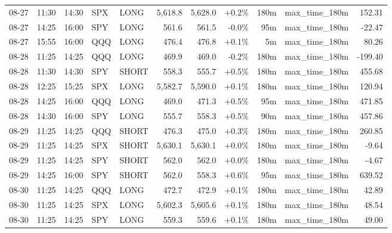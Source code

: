 \documentclass[11pt,a4paper,twoside]{article}
\begin{document}
\begin{center}
\begin{longtable}{>{\color{txtmain}}l l l l l r r r r >{\color{txtmain}}l r}
08-27 & 11:30 & 14:30 & SPX & LONG & 5,618.8 & 5,628.0 & \textcolor{wingreen}{+0.2\%} & 180m & max\_time\_180m & \textcolor{wingreen}{152.31} \\
08-27 & 14:25 & 16:00 & SPY & LONG & 561.6 & 561.5 & \textcolor{lossred}{-0.0\%} & 95m & max\_time\_180m & \textcolor{lossred}{-22.47} \\
08-27 & 15:55 & 16:00 & QQQ & LONG & 476.4 & 476.8 & \textcolor{wingreen}{+0.1\%} & 5m & max\_time\_180m & \textcolor{wingreen}{80.26} \\
08-28 & 11:25 & 14:25 & QQQ & LONG & 469.9 & 469.0 & \textcolor{lossred}{-0.2\%} & 180m & max\_time\_180m & \textcolor{lossred}{-199.40} \\
08-28 & 11:30 & 14:30 & SPY & SHORT & 558.3 & 555.7 & \textcolor{wingreen}{+0.5\%} & 180m & max\_time\_180m & \textcolor{wingreen}{455.68} \\
08-28 & 12:25 & 15:25 & SPX & LONG & 5,582.7 & 5,590.0 & \textcolor{wingreen}{+0.1\%} & 180m & max\_time\_180m & \textcolor{wingreen}{120.94} \\
08-28 & 14:25 & 16:00 & QQQ & LONG & 469.0 & 471.3 & \textcolor{wingreen}{+0.5\%} & 95m & max\_time\_180m & \textcolor{wingreen}{471.85} \\
08-28 & 14:30 & 16:00 & SPY & LONG & 555.7 & 558.3 & \textcolor{wingreen}{+0.5\%} & 90m & max\_time\_180m & \textcolor{wingreen}{457.86} \\
08-29 & 11:25 & 14:25 & QQQ & SHORT & 476.3 & 475.0 & \textcolor{wingreen}{+0.3\%} & 180m & max\_time\_180m & \textcolor{wingreen}{260.85} \\
08-29 & 11:25 & 14:25 & SPX & SHORT & 5,630.1 & 5,630.1 & \textcolor{wingreen}{+0.0\%} & 180m & max\_time\_180m & \textcolor{lossred}{-9.64} \\
08-29 & 11:25 & 14:25 & SPY & SHORT & 562.0 & 562.0 & \textcolor{wingreen}{+0.0\%} & 180m & max\_time\_180m & \textcolor{lossred}{-4.67} \\
08-29 & 14:25 & 16:00 & SPY & SHORT & 562.0 & 558.3 & \textcolor{wingreen}{+0.6\%} & 95m & max\_time\_180m & \textcolor{wingreen}{639.52} \\
08-30 & 11:25 & 14:25 & QQQ & LONG & 472.7 & 472.9 & \textcolor{wingreen}{+0.1\%} & 180m & max\_time\_180m & \textcolor{wingreen}{42.89} \\
08-30 & 11:25 & 14:25 & SPX & LONG & 5,602.3 & 5,605.6 & \textcolor{wingreen}{+0.1\%} & 180m & max\_time\_180m & \textcolor{wingreen}{48.54} \\
08-30 & 11:25 & 14:25 & SPY & LONG & 559.3 & 559.6 & \textcolor{wingreen}{+0.1\%} & 180m & max\_time\_180m & \textcolor{wingreen}{49.00} \\

\end{longtable}
\end{center}
\end{document}
